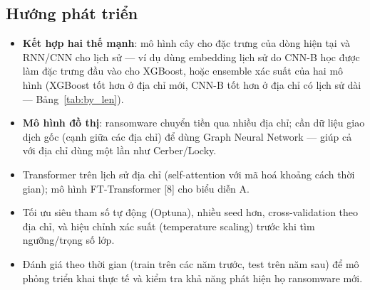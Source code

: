 \subsection{Hướng phát triển}
\begin{itemize}
\item \textbf{Kết hợp hai thế mạnh}: mô hình cây cho đặc trưng của dòng hiện tại và RNN/CNN cho lịch sử --- ví dụ dùng embedding
  lịch sử do CNN-B học được làm đặc trưng đầu vào cho XGBoost, hoặc ensemble xác suất của hai mô hình (XGBoost tốt hơn ở địa chỉ
  mới, CNN-B tốt hơn ở địa chỉ có lịch sử dài --- Bảng~\ref{tab:by_len}).
\item \textbf{Mô hình đồ thị}: ransomware chuyển tiền qua nhiều địa chỉ; cần dữ liệu giao dịch gốc (cạnh giữa các địa chỉ) để dùng
  Graph Neural Network --- giúp cả với địa chỉ dùng một lần như Cerber/Locky.
\item Transformer trên lịch sử địa chỉ (self-attention với mã hoá khoảng cách thời gian); mô hình FT-Transformer [8] cho biểu diễn A.
\item Tối ưu siêu tham số tự động (Optuna), nhiều seed hơn, cross-validation theo địa chỉ, và hiệu chỉnh xác suất (temperature scaling)
  trước khi tìm ngưỡng/trọng số lớp.
\item Đánh giá theo thời gian (train trên các năm trước, test trên năm sau) để mô phỏng triển khai thực tế và kiểm tra khả năng phát hiện
  họ ransomware mới.
\end{itemize}
